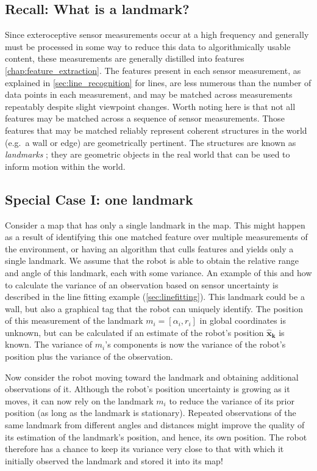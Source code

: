 \subsection{Recall: What is a landmark?}
Since exteroceptive sensor measurements occur at a high frequency and generally must be processed in some way to reduce this data to algorithmically usable content, these measurements are generally distilled into features \cref{chap:feature_extraction}. The features present in each sensor measurement, as explained in \cref{sec:line_recognition} for lines, are less numerous than the number of data points in each measurement, and may be matched across measurements repeatably despite slight viewpoint changes. Worth noting here is that not all features may be matched across a sequence of sensor measurements. Those features that may be matched reliably represent coherent structures in the world (e.g.\ a wall or edge) are geometrically pertinent. The structures are known as \emph{landmarks} ; they are geometric objects in the real world that can be used to inform motion within the world.

\subsection{Special Case I: one landmark}
Consider a map that has only a single landmark in the map. This might happen as a result of identifying this one matched feature over multiple measurements of the environment, or having an algorithm that culls features and yields only a single landmark. We assume that the robot is able to obtain the relative range and angle of this landmark, each with some variance. An example of this and how to calculate the variance of an observation based on sensor uncertainty is described in the line fitting example (\cref{sec:linefitting}). This landmark could be a wall, but also a graphical tag that the robot can uniquely identify. The position of this measurement of the landmark $m_i=[\alpha_i,r_i]$  in global coordinates is unknown, but can be calculated if an estimate of the robot's position $\boldsymbol{\hat{x}_k}$ is known.  The variance of $ m_i$'s components is now the variance of the robot's position plus the variance of the observation.

Now consider the robot moving toward the landmark and obtaining additional observations of it. Although the robot's position uncertainty is growing as it moves, it can now rely on the landmark $m_i$ to reduce the variance of its prior position (as long as the landmark is stationary). Repeated observations of the same landmark from different angles and distances might improve the quality of its estimation of the landmark's position, and hence, its own position. The robot therefore has a chance to keep its variance very close to that with which it initially observed the landmark and stored it into its map!

